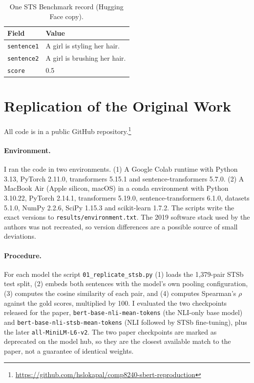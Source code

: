 \documentclass[11pt]{article}
\begin{document}
\begin{table}[h]
\centering\small
\begin{tabular}{ll}
\toprule
Field & Value \\
\midrule
\texttt{sentence1} & A girl is styling her hair. \\
\texttt{sentence2} & A girl is brushing her hair. \\
\texttt{score} & 0.5 \\
\bottomrule
\end{tabular}
\caption{One STS Benchmark record (Hugging Face copy).}
\end{table}

\section{Replication of the Original Work}
\label{sec:replication}

All code is in a public GitHub repository.\footnote{\url{https://github.com/hslokapal/comp8240-sbert-reproduction}}

\paragraph{Environment.}
I ran the code in two environments. (1) A Google Colab runtime with Python 3.13, PyTorch 2.11.0, transformers 5.15.1 and sentence-transformers 5.7.0. (2) A MacBook Air (Apple silicon, macOS) in a conda environment with Python 3.10.22, PyTorch 2.14.1, transformers 5.19.0, sentence-transformers 6.1.0, datasets 5.1.0, NumPy 2.2.6, SciPy 1.15.3 and scikit-learn 1.7.2. The scripts write the exact versions to \texttt{results/environment.txt}. The 2019 software stack used by the authors was not recreated, so version differences are a possible source of small deviations.

\paragraph{Procedure.}
For each model the script \texttt{01\_replicate\_stsb.py} (1) loads the 1,379-pair STSb test split, (2) embeds both sentences with the model's own pooling configuration, (3) computes the cosine similarity of each pair, and (4) computes Spearman's $\rho$ against the gold scores, multiplied by 100. I evaluated the two checkpoints released for the paper, \texttt{bert-base-nli-mean-tokens} (the NLI-only base model) and \texttt{bert-base-nli-stsb-mean-tokens} (NLI followed by STSb fine-tuning), plus the later \texttt{all-MiniLM-L6-v2}. The two paper checkpoints are marked as deprecated on the model hub, so they are the closest available match to the paper, not a guarantee of identical weights.
\end{document}
